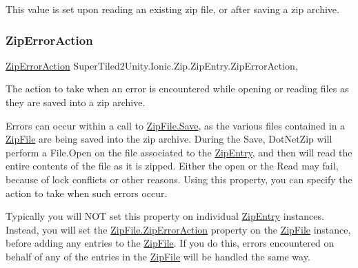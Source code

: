 This value is set upon reading an existing zip file, or after saving a zip archive. \mbox{\label{class_super_tiled2_unity_1_1_ionic_1_1_zip_1_1_zip_entry_a55a679298f00c5eef672e947c6293304}} 
\subsubsection{\texorpdfstring{Zip\+Error\+Action}{ZipErrorAction}}
{\footnotesize\ttfamily \mbox{\hyperlink{namespace_super_tiled2_unity_1_1_ionic_1_1_zip_a5597d8881459658d304cdc5fdae35593}{Zip\+Error\+Action}} Super\+Tiled2\+Unity.\+Ionic.\+Zip.\+Zip\+Entry.\+Zip\+Error\+Action\hspace{0.3cm}{\ttfamily [get]}, {\ttfamily [set]}}



The action to take when an error is encountered while opening or reading files as they are saved into a zip archive. 

Errors can occur within a call to \mbox{\hyperlink{class_super_tiled2_unity_1_1_ionic_1_1_zip_1_1_zip_file_aff8f1b3d07b66481e2629b04017a056f}{Zip\+File.\+Save}}, as the various files contained in a \mbox{\hyperlink{class_super_tiled2_unity_1_1_ionic_1_1_zip_1_1_zip_file}{Zip\+File}} are being saved into the zip archive. During the {\ttfamily Save}, Dot\+Net\+Zip will perform a {\ttfamily File.\+Open} on the file associated to the \mbox{\hyperlink{class_super_tiled2_unity_1_1_ionic_1_1_zip_1_1_zip_entry}{Zip\+Entry}}, and then will read the entire contents of the file as it is zipped. Either the open or the Read may fail, because of lock conflicts or other reasons. Using this property, you can specify the action to take when such errors occur. 

Typically you will N\+OT set this property on individual \mbox{\hyperlink{class_super_tiled2_unity_1_1_ionic_1_1_zip_1_1_zip_entry}{Zip\+Entry}} instances. Instead, you will set the \mbox{\hyperlink{class_super_tiled2_unity_1_1_ionic_1_1_zip_1_1_zip_file_a68ea59eb815f14ecc6f060da3a77e5a6}{Zip\+File.\+Zip\+Error\+Action}} property on the \mbox{\hyperlink{class_super_tiled2_unity_1_1_ionic_1_1_zip_1_1_zip_file}{Zip\+File}} instance, before adding any entries to the {\ttfamily \mbox{\hyperlink{class_super_tiled2_unity_1_1_ionic_1_1_zip_1_1_zip_file}{Zip\+File}}}. If you do this, errors encountered on behalf of any of the entries in the \mbox{\hyperlink{class_super_tiled2_unity_1_1_ionic_1_1_zip_1_1_zip_file}{Zip\+File}} will be handled the same way. 

